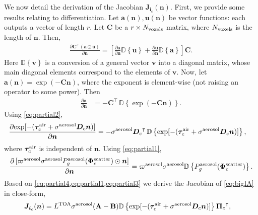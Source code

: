 \documentclass[10pt,letterpaper]{article}
\newcommand{\abbrev}[1]{\rm{#1}}
\newcommand{\PartDeriv}[2]{\frac{\partial{#1}}{\partial{#2}}}
\newcommand{\vect}[1]{\bm{#1}}
\newcommand{\mat}[1]{\bm{#1}}
\newcommand{\transpose}[1]{{#1}^\intercal}
\newcommand{\OpDistance}{\bm{D}}
\newcommand{\OpDiag}[1]{\mathbb{D}\left\{#1\right\}}
\begin{document}
We now detail the derivation of the Jacobian ${\bm J}_{{\bm i}_c}({\bm
  n})$. First, we provide some results relating to differentiation.
Let $\vect{a}(\vect{n}),\vect{u}(\vect{n})$ be vector functions: each
outputs a vector of length $r$. Let $\mat{C}$ be a $r \times N_{\rm
  voxels}$ matrix, where $N_{\rm voxels}$ is the length of ${\bm n}$.
Then,
\begin{align}
  \label{eq:partial1}
  \PartDeriv{\transpose{\mat{C}} (\vect{a} \odot \vect{u})}{\vect{n}}
  = \left[ \PartDeriv{\vect{a}}{\vect{n}} \OpDiag{\vect{u}} +
    \PartDeriv{\vect{u}}{\vect{n}} \OpDiag{\vect{a}} \right] \mat{C}.
\end{align}
Here $\OpDiag{\vect{v}}$ is a conversion of a general vector
$\vect{v}$ into a diagonal matrix, whose main diagonal elements
correspond to the elements of $\vect{v}$. Now, let
$\vect{a}(\vect{n}) = \exp(-{\mat{C}}\vect{n})$,
where the exponent is element-wise (not raising an operator to some
power). Then
\begin{align}
  \label{eq:partial2}
  \PartDeriv{\vect{a}}{\vect{n}} &= - \transpose{\mat{C}} \,
  \OpDiag{\exp(-{\mat{C}}\vect{n})}.
\end{align}
Using \cref{eq:partial2},
\begin{align}
  \label{eq:partial4}
  \PartDeriv{\exp[-(\vect{\tau}_c^{\rm air} + {\sigma}^{\rm
      aerosol}{\bm D}_c {\bm n})]}
  {\vect{n}} &= - {\sigma}^{\rm aerosol}\transpose{\OpDistance_c} \,
  \OpDiag{\exp[-(\vect{\tau}_c^{\rm air} + {\sigma}^{\rm aerosol}{\bm
      D}_c {\bm n})]},
\end{align}
where $\vect{\tau}_c^{\rm air}$ is independent of ${\bm n}$. Using
\cref{eq:partial1},
\begin{align}
  \label{eq:partial3}
  \PartDeriv{\, [\varpi^{\rm aerosol}\sigma^{\rm aerosol} P^{\rm
      aerosol}_g(\vect{\Phi}^{\rm scatter}_c) \odot{\bm n}]}{\vect{n}}
  = \varpi^{\rm aerosol}\sigma^{\rm aerosol}\OpDiag{P^{\rm
      aerosol}_g(\vect{\Phi}^{\rm scatter}_c)}.
\end{align}
Based on \cref{eq:partial4,eq:partial1,eq:partial3} we derive the
Jacobian of \cref{eq:bigIA} in close-form,
\begin{align}
  {\bm J}_{{\bm i}_c}({\bm n}) &= L^{\rm TOA}{\sigma}^{\rm
    aerosol}({\bf A}-{\bf B}) \OpDiag{\exp[-(\vect{\tau}_c^{\rm air} +
    {\sigma}^{\rm aerosol} {\bm D}_c {\bm n})]}
  \transpose{{\vect{\Pi}}_c} ,
  \label{eq:gradient2}
\end{align}
\end{document}
